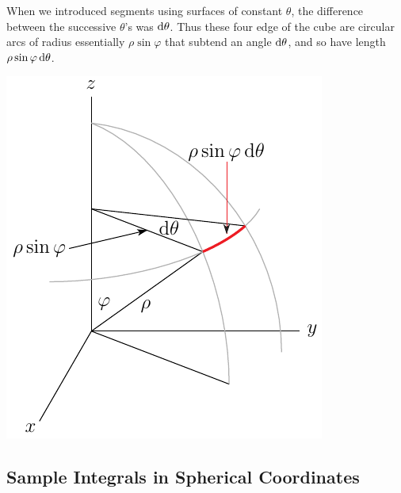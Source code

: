 \begin{itemize}
\begin{efig}
\begin{center}
\end{center}
\end{efig}
When we introduced segments using surfaces of constant $\theta$, 
the difference between the successive $\theta$'s was $\mathrm{d}\theta$.
Thus these four edge of the cube are circular arcs of radius 
essentially $\rho\sin\varphi$ that subtend an angle $\mathrm{d}\theta$, and so
have length $\rho\sin\varphi\,\mathrm{d}\theta$.
\begin{efig}
\begin{center}
    \includegraphics[scale=0.8]{figures/coord/spher10.pdf}
\end{center}
\end{efig}
\end{itemize}



\subsection{Sample Integrals in Spherical Coordinates} \label{sec spherical eg}


